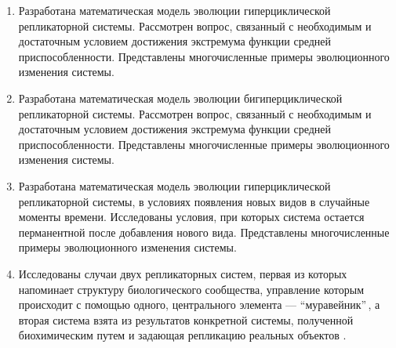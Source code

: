 {}
\begin{enumerate}
\item Разработана математическая модель эволюции гиперциклической репликаторной системы. Рассмотрен вопрос, связанный с необходимым и достаточным условием достижения экстремума функции средней приспособленности. Представлены многочисленные примеры эволюционного изменения системы. 

\item Разработана математическая модель эволюции бигиперциклической репликаторной системы. Рассмотрен вопрос, связанный с необходимым и достаточным условием достижения экстремума функции средней приспособленности. Представлены многочисленные примеры эволюционного изменения системы. 

\item Разработана математическая модель эволюции гиперциклической репликаторной системы, в условиях появления новых видов в случайные моменты времени. Исследованы условия, при которых система остается перманентной после добавления нового вида. Представлены многочисленные примеры эволюционного изменения системы. 

\item Исследованы случаи двух репликаторных систем, первая из которых напоминает структуру биологического сообщества, управление которым происходит с помощью одного, центрального элемента --- ``муравейник''\,, а вторая система взята из результатов конкретной системы, полученной биохимическим путем и задающая репликацию реальных объектов \cite{Vaidya}. 
\end{enumerate}



